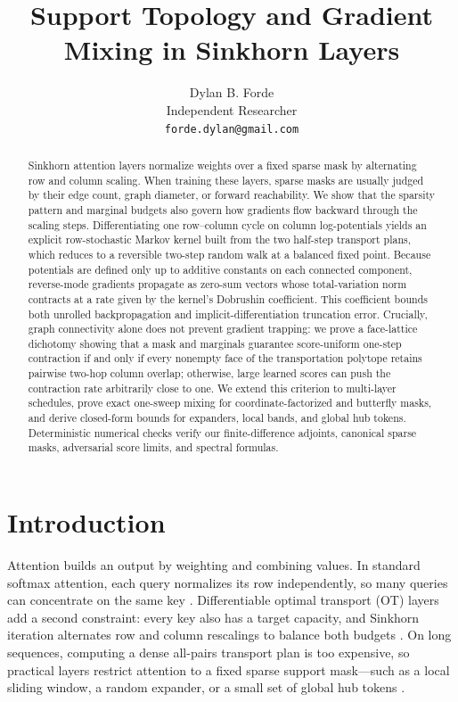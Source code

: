 \documentclass[10pt]{article}
\title{Support Topology and Gradient Mixing in Sinkhorn Layers}
\author{Dylan B. Forde\\Independent Researcher\\\texttt{forde.dylan@gmail.com}}
\date{}
\begin{document}
\maketitle

\begin{abstract}
Sinkhorn attention layers normalize weights over a fixed sparse mask by alternating row and column scaling. When training these layers, sparse masks are usually judged by their edge count, graph diameter, or forward reachability. We show that the sparsity pattern and marginal budgets also govern how gradients flow backward through the scaling steps. Differentiating one row--column cycle on column log-potentials yields an explicit row-stochastic Markov kernel built from the two half-step transport plans, which reduces to a reversible two-step random walk at a balanced fixed point. Because potentials are defined only up to additive constants on each connected component, reverse-mode gradients propagate as zero-sum vectors whose total-variation norm contracts at a rate given by the kernel's Dobrushin coefficient. This coefficient bounds both unrolled backpropagation and implicit-differentiation truncation error. Crucially, graph connectivity alone does not prevent gradient trapping: we prove a face-lattice dichotomy showing that a mask and marginals guarantee score-uniform one-step contraction if and only if every nonempty face of the transportation polytope retains pairwise two-hop column overlap; otherwise, large learned scores can push the contraction rate arbitrarily close to one. We extend this criterion to multi-layer schedules, prove exact one-sweep mixing for coordinate-factorized and butterfly masks, and derive closed-form bounds for expanders, local bands, and global hub tokens. Deterministic numerical checks verify our finite-difference adjoints, canonical sparse masks, adversarial score limits, and spectral formulas.
\end{abstract}

\section{Introduction}

Attention builds an output by weighting and combining values. In standard softmax attention, each query normalizes its row independently, so many queries can concentrate on the same key \citep{vaswani2017attention}. Differentiable optimal transport (OT) layers add a second constraint: every key also has a target capacity, and Sinkhorn iteration alternates row and column rescalings to balance both budgets \citep{cuturi2013sinkhorn,tay2020sparse,sander2022sinkformers}. On long sequences, computing a dense all-pairs transport plan is too expensive, so practical layers restrict attention to a fixed sparse support mask---such as a local sliding window, a random expander, or a small set of global hub tokens \citep{beltagy2020longformer,zaheer2020bigbird,forde2026blockwise}.
\end{document}
